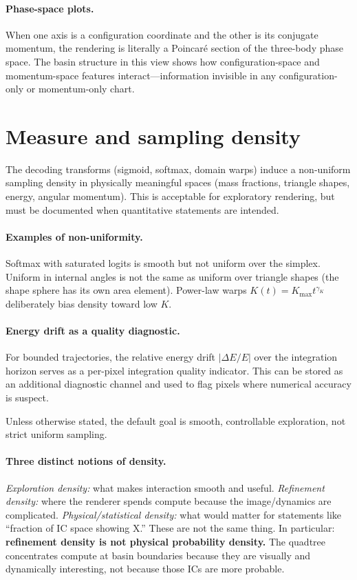 \documentclass[11pt]{report}
\begin{document}
\paragraph{Phase-space plots.} When one axis is a configuration coordinate and the other is its conjugate momentum, the rendering is literally a Poincar\'e section of the three-body phase space. The basin structure in this view shows how configuration-space and momentum-space features interact---information invisible in any configuration-only or momentum-only chart.

\section{Measure and sampling density}
\label{sec:measure}

The decoding transforms (sigmoid, softmax, domain warps) induce a non-uniform sampling density in physically meaningful spaces (mass fractions, triangle shapes, energy, angular momentum). This is acceptable for exploratory rendering, but must be documented when quantitative statements are intended.

\paragraph{Examples of non-uniformity.} Softmax with saturated logits is smooth but not uniform over the simplex. Uniform in internal angles is not the same as uniform over triangle shapes (the shape sphere has its own area element). Power-law warps $K(t)=K_{\max}t^{\gamma_K}$ deliberately bias density toward low $K$.

\paragraph{Energy drift as a quality diagnostic.} For bounded trajectories, the relative energy drift $|\Delta E/E|$ over the integration horizon serves as a per-pixel integration quality indicator. This can be stored as an additional diagnostic channel and used to flag pixels where numerical accuracy is suspect.

Unless otherwise stated, the default goal is smooth, controllable exploration, not strict uniform sampling.

\paragraph{Three distinct notions of density.} \emph{Exploration density:} what makes interaction smooth and useful. \emph{Refinement density:} where the renderer spends compute because the image/dynamics are complicated. \emph{Physical/statistical density:} what would matter for statements like ``fraction of IC space showing X.'' These are not the same thing. In particular: \textbf{refinement density is not physical probability density.} The quadtree concentrates compute at basin boundaries because they are visually and dynamically interesting, not because those ICs are more probable.
\end{document}
